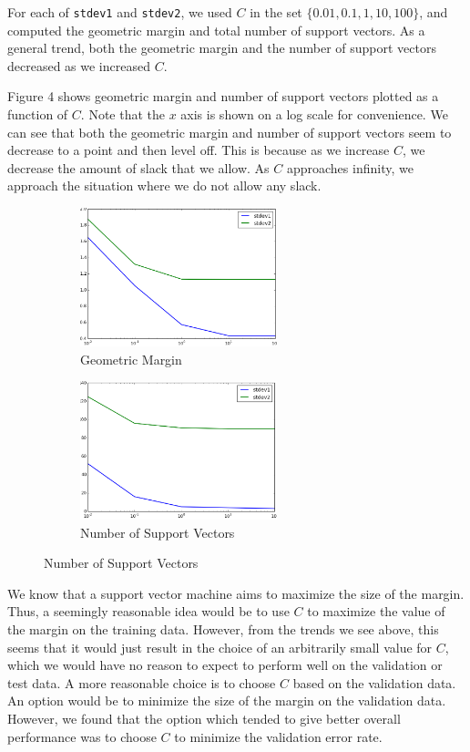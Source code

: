 \documentclass{sigchi}
\begin{document}
For each of \texttt{stdev1} and \texttt{stdev2}, we used $C$ in the set $\{0.01, 0.1, 1, 10, 100\}$, and computed the geometric margin and total number of support vectors. As a general trend, both the geometric margin and the number of support vectors decreased as we increased $C$. %

Figure 4 shows geometric margin and number of support vectors plotted as a function of $C$. Note that the $x$ axis is shown on a log scale for convenience. We can see that both the geometric margin and number of support vectors seem to decrease to a point and then level off. This is because as we increase $C$, we decrease the amount of slack that we allow. As $C$ approaches infinity, we approach the situation where we do not allow any slack.

\begin{figure}
\centering

\begin{subfigure}[b]{2.25in}
	\includegraphics[width = 2.25in]{plots/1-3/margin.png}
	\caption{Geometric Margin}
\end{subfigure}

\begin{subfigure}[b]{2.25in}
	\includegraphics[width = 2.25in]{plots/1-3/support_vectors.png}
	\caption{Number of Support Vectors}
\end{subfigure}

\end{figure}

We know that a support vector machine aims to maximize the size of the margin. Thus, a seemingly reasonable idea would be to use $C$ to maximize the value of the margin on the training data. However, from the trends we see above, this seems that it would just result in the choice of an arbitrarily small value for $C$, which we would have no reason to expect to perform well on the validation or test data. A more reasonable choice is to choose $C$ based on the validation data. An option would be to minimize the size of the margin on the validation data. However, we found that the option which tended to give better overall performance was to choose $C$ to minimize the validation error rate.
\end{document}
